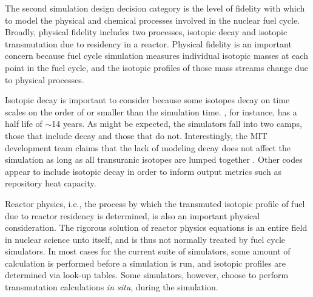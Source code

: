 The second simulation design decision category is the level of fidelity with
which to model the physical and chemical processes involved in the nuclear fuel
cycle. Broadly, physical fidelity includes two processes, isotopic decay and
isotopic transmutation due to residency in a reactor. Physical fidelity is an
important concern because fuel cycle simulation measures individual isotopic
masses at each point in the fuel cycle, and the isotopic profiles of those mass
streams change due to physical processes. 

Isotopic decay is important to consider because some isotopes decay on time
scales on the order of or smaller than the simulation time. , for
instance, has a half life of $\sim$14 years. As might be expected, the
simulators fall into two camps, those that include decay and those that do
not. Interestingly, the MIT development team claims that the lack of modeling
decay does not affect the simulation as long as all transuranic isotopes are
lumped together \cite{guerin_impact_2009}. Other codes appear to include
isotopic decay in order to inform output metrics such as repository heat
capacity. 

Reactor physics, i.e., the process by which the transmuted isotopic profile of
fuel due to reactor residency is determined, is also an important physical
consideration. The rigorous solution of reactor physics equations is an entire
field in nuclear science unto itself, and is thus not normally treated by fuel
cycle simulators. In most cases for the current suite of simulators, some amount
of calculation is performed before a simulation is run, and isotopic profiles
are determined via look-up tables. Some simulators, however, choose to perform
transmutation calculations \textit{in situ}, during the simulation.

